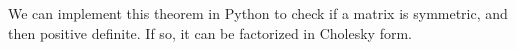   We can implement this theorem in Python to check if a matrix is symmetric, and then positive definite. If so, it can be factorized in Cholesky form.
  
  \inputminted[frame = lines, bgcolor = lightgray, linenos]{python}{PythonSources/spdCheck.py}

